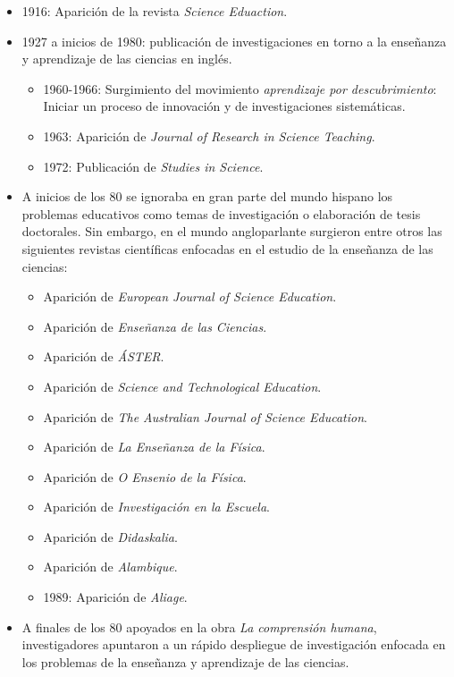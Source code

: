 \documentclass[12pt]{report}
\newcounter{it}
\theoremstyle{largebreak}
\begin{document}
    \begin{itemize}
        \item 1916: Aparición de la revista \textit{Science Eduaction}.
        \item 1927 a inicios de 1980: publicación de investigaciones en torno a la enseñanza y aprendizaje de las ciencias en inglés.
        \begin{itemize}
            \item 1960-1966: Surgimiento del movimiento \textit{aprendizaje por descubrimiento}: Iniciar un proceso de innovación y de investigaciones sistemáticas.
            \item 1963: Aparición de \textit{Journal of Research in Science Teaching}.
        \item 1972: Publicación de \textit{Studies in Science}.
        \end{itemize}
        \item A inicios de los 80 se ignoraba en gran parte del mundo hispano los problemas educativos como temas de investigación o elaboración de tesis doctorales. Sin embargo, en el mundo angloparlante surgieron entre otros las siguientes revistas científicas enfocadas en el estudio de la enseñanza de las ciencias:
        \begin{itemize}
            \item Aparición de \textit{European Journal of Science Education}.
            \item Aparición de \textit{Enseñanza de las Ciencias}.
            \item Aparición de \textit{ÁSTER}.
            \item Aparición de \textit{Science and Technological Education}.
            \item Aparición de \textit{The Australian Journal of Science Education}.
            \item Aparición de \textit{La Enseñanza de la Física}.
            \item Aparición de \textit{O Ensenio de la Física}.
            \item Aparición de \textit{Investigación en la Escuela}.
            \item Aparición de \textit{Didaskalia}.
            \item Aparición de \textit{Alambique}.
            \item 1989: Aparición de \textit{Aliage}.
        \end{itemize}
        \item A finales de los 80 apoyados en la obra \textit{La comprensión humana}, investigadores apuntaron a un rápido despliegue de investigación enfocada en los problemas de la enseñanza y aprendizaje de las ciencias.

\end{itemize}
\end{document}
